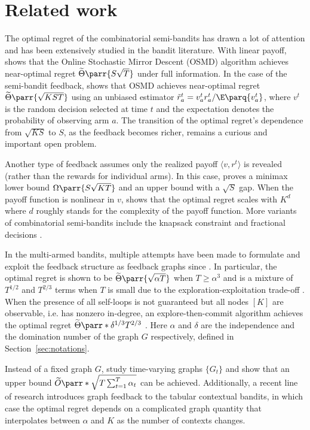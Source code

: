 \section{Related work}
The optimal regret of the combinatorial semi-bandits has drawn a lot of attention and has been extensively studied in the bandit literature. With linear payoff, \cite{koolen2010hedging} shows that the Online Stochastic Mirror Descent (OSMD) algorithm achieves near-optimal regret $\widetilde\Theta\parr{S\sqrt{T}}$ under full information. In the case of the semi-bandit feedback, \cite{audibert2014regret} shows that OSMD achieves near-optimal regret $\widetilde\Theta\parr{\sqrt{KST}}$ using an unbiased estimator $\Tilde{r}^t_a = v^t_ar^t_a / \E\parq{v^t_a}$, where $v^t$ is the random decision selected at time $t$ and the expectation denotes the probability of observing arm $a$. The transition of the optimal regret's dependence from $\sqrt{KS}$ to $S$, as the feedback becomes richer, remains a curious and important open problem. 

Another type of feedback assumes only the realized payoff $\langle v, r^t\rangle$ is revealed (rather than the rewards for individual arms). In this case, \cite{audibert2014regret} proves a minimax lower bound $\Omega\parr{S\sqrt{KT}}$ and an upper bound with a $\sqrt{S}$ gap. When the payoff function is nonlinear in $v$, \cite{han2021adversarial} shows that the optimal regret scales with $K^d$ where $d$ roughly stands for the complexity of the payoff function. More variants of combinatorial semi-bandits include the knapsack constraint \cite{sankararaman2018combinatorial} and fractional decisions \cite{pmlr-v37-wen15}.

In the multi-armed bandits, multiple attempts have been made to formulate and exploit the feedback structure as feedback graphs since \cite{mannor2011bandits}. In particular, the optimal regret is shown to be $\widetilde\Theta\parr{\sqrt{\alpha T}}$ when $T\geq \alpha^3$ \cite{alon2015online, eldowa2024minimax} and is a mixture of $T^{1/2}$ and $T^{2/3}$ terms when $T$ is small due to the exploration-exploitation trade-off \cite{kocak2023online}. When the presence of all self-loops is not guaranteed but all nodes $[K]$ are observable, i.e. has nonzero in-degree, an explore-then-commit algorithm achieves the optimal regret $\widetilde\Theta\parr*{\delta^{1/3}T^{2/3}}$ \cite{alon2015online}. Here $\alpha$ and $\delta$ are the independence and the domination number of the graph $G$ respectively, defined in Section~\ref{sec:notations}. 

Instead of a fixed graph $G$, \cite{cohen2016online, alon2017nonstochastic} study time-varying graphs $\{G_t\}$ and show that an upper bound $\widetilde{O}\parr*{\sqrt{T\sum_{t=1}^T\alpha_t}}$ can be achieved. Additionally, a recent line of research \cite{balseiro2023contextual, han2024optimal, wen2024stochastic} introduces graph feedback to the tabular contextual bandits, in which case the optimal regret depends on a complicated graph quantity that interpolates between $\alpha$ and $K$ as the number of contexts changes.